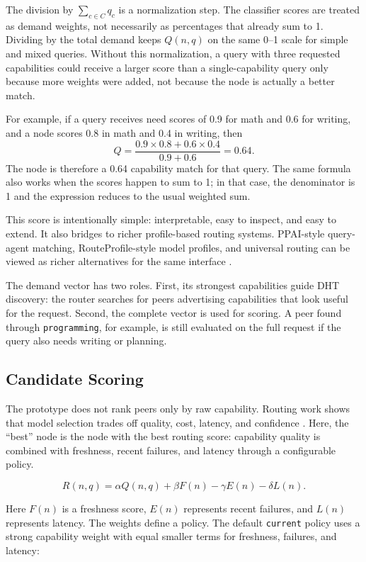 The division by \(\sum_{c \in C} q_c\) is a normalization step. The classifier
scores are treated as demand weights, not necessarily as percentages that
already sum to 1. Dividing by the total demand keeps \(Q(n,q)\) on the same
0--1 scale for simple and mixed queries. Without this normalization, a query
with three requested capabilities could receive a larger score than a
single-capability query only because more weights were added, not because the
node is actually a better match.

For example, if a query receives need scores of 0.9 for math and 0.6 for
writing, and a node scores 0.8 in math and 0.4 in writing, then
\[
  Q = \frac{0.9 \times 0.8 + 0.6 \times 0.4}{0.9 + 0.6} = 0.64.
\]
The node is therefore a 0.64 capability match for that query. The same formula
also works when the scores happen to sum to 1; in that case, the denominator is
1 and the expression reduces to the usual weighted sum.

This score is intentionally simple: interpretable, easy to inspect, and easy to
extend. It also bridges to richer profile-based routing systems. PPAI-style
query-agent matching, RouteProfile-style model profiles, and universal routing
can be viewed as richer alternatives for the same interface
\citep{wang2026ppai,xu2026routeprofile,jitkrittum2025uniroute}.

The demand vector has two roles. First, its strongest capabilities guide DHT
discovery: the router searches for peers advertising capabilities that look
useful for the request. Second, the complete vector is used for scoring. A
peer found through \texttt{programming}, for example, is still evaluated on the
full request if the query also needs writing or planning.

\subsection{Candidate Scoring}

The prototype does not rank peers only by raw capability. Routing work shows
that model selection trades off quality, cost, latency, and confidence
\citep{chen2023frugalgpt,ong2025routellm,moslem2026dynamicrouting}. Here, the
``best'' node is the node with the best routing score: capability quality is
combined with freshness, recent failures, and latency through a configurable
policy.

\[
  R(n, q) =
  \alpha Q(n, q)
  + \beta F(n)
  - \gamma E(n)
  - \delta L(n).
\]

Here \(F(n)\) is a freshness score, \(E(n)\) represents recent failures, and
\(L(n)\) represents latency. The weights define a policy. The default
\texttt{current} policy uses a strong capability weight with equal smaller
terms for freshness, failures, and latency:

